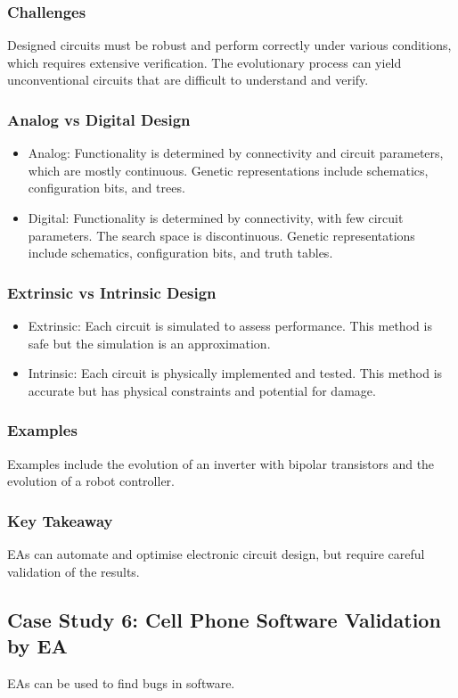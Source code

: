 \subsubsection*{Challenges}
Designed circuits must be robust and perform correctly under various conditions, which requires extensive verification. The evolutionary process can yield unconventional circuits that are difficult to understand and verify.
\subsubsection*{Analog vs Digital Design}
\begin{itemize}
    \item Analog: Functionality is determined by connectivity and circuit parameters, which are mostly continuous. Genetic representations include schematics, configuration bits, and trees.
    \item Digital: Functionality is determined by connectivity, with few circuit parameters. The search space is discontinuous. Genetic representations include schematics, configuration bits, and truth tables.
\end{itemize}
\subsubsection*{Extrinsic vs Intrinsic Design}
\begin{itemize}
    \item Extrinsic: Each circuit is simulated to assess performance. This method is safe but the simulation is an approximation.
    \item Intrinsic: Each circuit is physically implemented and tested. This method is accurate but has physical constraints and potential for damage.
\end{itemize}
\subsubsection*{Examples}
Examples include the evolution of an inverter with bipolar transistors and the evolution of a robot controller.
\subsubsection*{Key Takeaway}
EAs can automate and optimise electronic circuit design, but require careful validation of the results.

\subsection*{Case Study 6: Cell Phone Software Validation by EA}
EAs can be used to find bugs in software.
